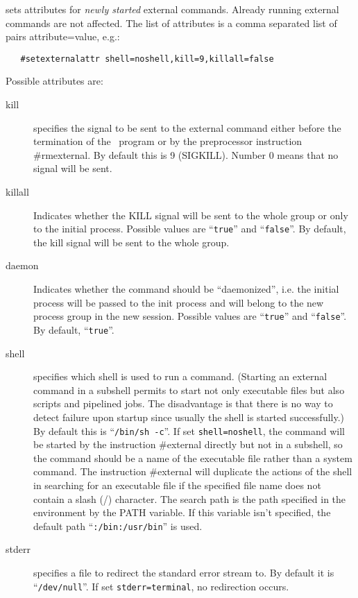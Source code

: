 \noindent sets attributes for {\em newly started} 
external commands. Already running external commands are not affected. The 
list of attributes is a comma separated list of pairs attribute=value, 
e.g.:
\begin{verbatim}
   #setexternalattr shell=noshell,kill=9,killall=false
\end{verbatim}
Possible attributes are:
\begin{description}
\item[kill]
specifies the signal to be sent to the external command either before the 
termination of the \FORM\ program or by the preprocessor instruction 
\#rmexternal. By default this is 9 
(SIGKILL). Number 0 means that no signal will be 
sent.
\item[killall] Indicates whether the KILL 
signal will be sent to the whole group or only to the initial process. 
Possible values are ``\verb|true|'' and ``\verb|false|''. By default, the 
kill signal will be sent to the whole group.
\item[daemon]
Indicates whether the command should be ``daemonized'', i.e. 
the initial process will be passed to the init process and will belong
to the new process group in the new session.  
Possible values are ``\verb|true|'' and ``\verb|false|''. By default, 
``\verb|true|''.
\item[shell]
specifies which shell is used to run a command. (Starting an 
external command in a subshell permits to start not only executable files 
but also scripts and pipelined jobs. The disadvantage is that there is no 
way to detect failure upon startup since usually the shell is started 
successfully.) By default this is ``\verb|/bin/sh -c|''.  If set 
\verb|shell=noshell|, the command will be started by the instruction 
\#external directly but not in a subshell, so the command 
should be a name of the executable file rather than a system command. The 
instruction \#external will duplicate the actions of the shell in searching 
for an executable file if the specified file name does not contain a slash 
(/) character.  The search path is the path specified in 
the environment by the PATH variable.  If this variable isn't 
specified, the default path ``\verb|:/bin:/usr/bin|'' is used.
\item[stderr]
specifies a file to redirect the standard error stream 
to. By default it is ``\verb|/dev/null|''. If set \verb|stderr=terminal|,
no redirection occurs.
\end{description}

